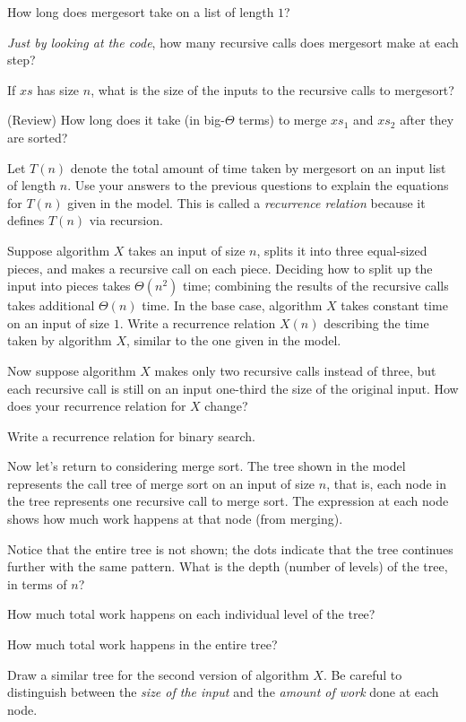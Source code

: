 \documentclass{tufte-handout}
\begin{document}
\begin{questions}
  \item How long does \textsf{mergesort} take on a list of length $1$?
  \item \emph{Just by looking at the code}, how many recursive calls does
  \textsf{mergesort} make at each step?
  \item If $xs$ has size $n$, what is the size of the inputs to the
    recursive calls to \textsf{mergesort}?
  \item (Review) How long does it take (in big-$\Theta$ terms) to
    merge $xs_1$ and $xs_2$ after they are sorted?
  \item Let $T(n)$ denote the total amount of time taken by
    \textsf{mergesort} on an input list of length $n$.  Use your
    answers to the previous questions to explain the equations for
    $T(n)$ given in the model.  This is called a \emph{recurrence
      relation} because it defines $T(n)$ via recursion.
  \item Suppose algorithm $X$ takes an input of size $n$, splits it
    into three equal-sized pieces, and makes a recursive call on each
    piece.  Deciding how to split up the input into pieces takes
    $\Theta(n^2)$ time; combining the results of the recursive calls
    takes additional $\Theta(n)$ time.  In the base case, algorithm
    $X$ takes constant time on an input of size $1$. Write a
    recurrence relation $X(n)$ describing the time taken by algorithm
    $X$, similar to the one given in the model.
  \item Now suppose algorithm $X$ makes only two recursive calls instead
    of three, but each recursive call is still on an input one-third
    the size of the original input.  How does your recurrence relation
    for $X$ change?
  \item Write a recurrence relation for binary search.
\end{questions}

Now let's return to considering merge sort.  The tree shown in
the model represents the call tree of merge sort on an input of
size $n$, that is, each node in the tree represents one recursive call
to merge sort.  The expression at each node shows how much work
happens at that node (from merging).

\begin{questions}
  \item Notice that the entire tree is not shown; the dots indicate
    that the tree continues further with the same pattern.  What is
    the depth (number of levels) of the tree, in terms of $n$?
  \item How much total work happens on each individual level of the tree?
  \item How much total work happens in the entire tree?
  \item Draw a similar tree for the second version of algorithm
    $X$. Be careful to distinguish between the \emph{size of the
      input} and the \emph{amount of work} done at each node.
\end{questions}
\end{document}
